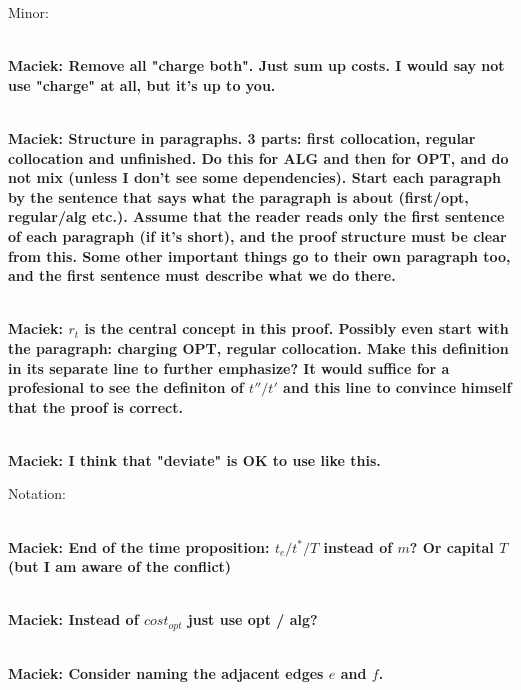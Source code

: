 \documentclass[manuscript,screen=true, review, anonymous]{acmart}
\newcommand\maciek[1]{\color{brown}\textbf{\\ Maciek: #1}\color{black}}
\begin{document}
Minor:

\maciek{Remove all "charge both". Just sum up costs. I would say not use "charge" at all, but it's up to you.}


\maciek{Structure in paragraphs. 3 parts: first collocation, regular collocation and unfinished. Do this for ALG and then for OPT, and do not mix (unless I don't see some dependencies). Start each paragraph by the sentence that says what the paragraph is about (first/opt, regular/alg etc.). Assume that the reader reads only the first sentence of each paragraph (if it's short), and the proof structure must be clear from this. Some other important things go to their own paragraph too, and the first sentence must describe what we do there.}

\maciek{$r_t$ is the central concept in this proof. Possibly even start with the paragraph: charging OPT, regular collocation. Make this definition in its separate line to further emphasize? It would suffice for a profesional to see the definiton of $t''/t'$ and this line to convince himself that the proof is correct.}

\maciek{I think that "deviate" is OK to use like this.}

Notation:

\maciek{End of the time proposition: $t_e / t^* / T$ instead of $m$? Or capital $T$ (but I am aware of the conflict)}

\maciek{Instead of $cost_{opt}$ just use opt / alg?}

\maciek{Consider naming the adjacent edges $e$ and $f$.}
\end{document}
